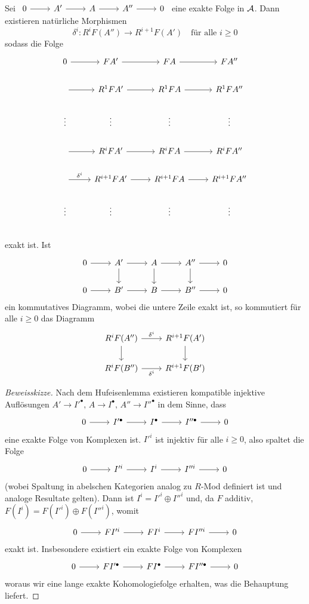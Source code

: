 \begin{sa}\label{8.3}
	Sei $\begin{tikzcd}
	0\arrow{r} & A'\arrow{r} & A \arrow{r} & A''\arrow{r} & 0
	\end{tikzcd}$ eine exakte Folge in $\mathcal{A}$. Dann existieren natürliche Morphismen 
	$$\delta^i:R^iF(A'') \longrightarrow R^{i+1}F(A') \quad \text{für alle } i\geq 0$$
	sodass die Folge 
	$$\begin{tikzcd}
	0 \arrow{r} & FA'\arrow{r} & FA \arrow{r} & FA''\\
	\arrow{r} & R^1FA' \arrow{r} & R^1FA \arrow{r} & R^1FA''\\
	\vdots & \vdots & \vdots & \vdots \\
	\arrow{r} & R^iFA' \arrow{r} & R^iFA \arrow{r} & R^iFA''\\
	\arrow{r}{\delta^i} & R^{i+1}FA' \arrow{r} & R^{i+1}FA \arrow{r} & R^{i+1}FA''\\
	\vdots & \vdots & \vdots & \vdots \\
	\end{tikzcd}$$
	exakt ist. Ist 
	$$\begin{tikzcd}
	0 \arrow{r} & A' \arrow{d}\arrow{r} & A \arrow{d}\arrow{r} & A'' \arrow{d}\arrow{r} & 0\\
	0 \arrow{r} & B'\arrow{r} & B \arrow{r} & B'' \arrow{r} & 0
	\end{tikzcd}$$
	ein kommutatives Diagramm, wobei die untere Zeile exakt ist, so kommutiert für alle $i\geq 0$ das Diagramm
	$$\begin{tikzcd}
	R^iF(A'') \arrow{r}{\delta^i} \arrow{d} & R^{i+1}F(A') \arrow{d} \\
	R^iF(B'') \arrow[swap]{r}{\delta^i} & R^{i+1}F(B')
	\end{tikzcd}$$
\end{sa}
\begin{proof}[Beweisskizze]
	Nach dem Hufeisenlemma existieren kompatible injektive Auflösungen $A'\to I'^\bullet, \, A\to I^\bullet, \, A''\to I''^\bullet$ in dem Sinne, dass
	$$\begin{tikzcd}
	0 \arrow{r} & I'^\bullet\arrow{r} & I^\bullet\arrow{r} & I''^\bullet \arrow{r} & 0
	\end{tikzcd}$$
	eine exakte Folge von Komplexen ist. $I'^i$ ist injektiv für alle $i\geq 0$, also spaltet die Folge
	$$ \begin{tikzcd}
	0 \arrow{r} & I'^i\arrow{r} & I^i\arrow{r} &I''^i \arrow{r} & 0
	\end{tikzcd}$$
	(wobei Spaltung in abelschen Kategorien analog zu $R$-Mod definiert ist und analoge Resultate gelten). Dann ist 
	$I^i= I'^i \oplus I''^i$ und, da $F$ additiv, $F(I^i) = F(I'^i) \oplus F(I''^i)$, womit
	$$\begin{tikzcd}
	0 \arrow{r} & FI'^i \arrow{r} & FI^i \arrow{r} & FI''^i \arrow{r} & 0
	\end{tikzcd}$$ exakt ist. Insbesondere existiert ein exakte Folge von Komplexen 
	$$\begin{tikzcd}
	0 \arrow{r} & FI'^\bullet\arrow{r} & FI^\bullet\arrow{r} & FI''^\bullet \arrow{r} & 0
	\end{tikzcd}$$
	woraus wir eine lange exakte Kohomologiefolge erhalten, was die Behauptung liefert.
\end{proof}
